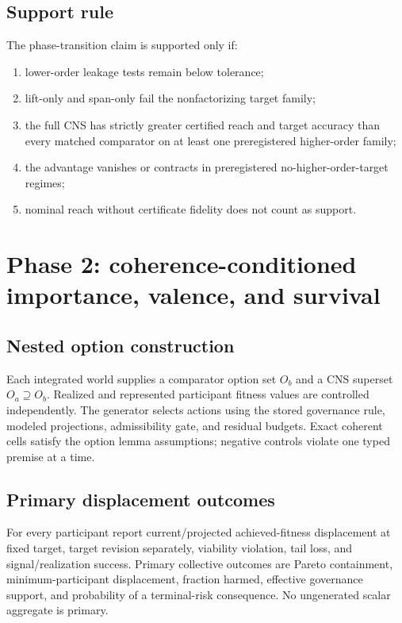 \documentclass[11pt]{article}
\begin{document}
\subsection{Support rule}

The phase-transition claim is supported only if:
\begin{enumerate}
\item lower-order leakage tests remain below tolerance;
\item lift-only and span-only fail the nonfactorizing target family;
\item the full CNS has strictly greater certified reach and target accuracy than every matched comparator on at least one preregistered higher-order family;
\item the advantage vanishes or contracts in preregistered no-higher-order-target regimes;
\item nominal reach without certificate fidelity does not count as support.
\end{enumerate}

\section{Phase 2: coherence-conditioned importance, valence, and survival}

\subsection{Nested option construction}

Each integrated world supplies a comparator option set $O_b$ and a CNS superset $O_a\supseteq O_b$. Realized and represented participant fitness values are controlled independently. The generator selects actions using the stored governance rule, modeled projections, admissibility gate, and residual budgets. Exact coherent cells satisfy the option lemma assumptions; negative controls violate one typed premise at a time.

\subsection{Primary displacement outcomes}

For every participant report current/projected achieved-fitness displacement at fixed target, target revision separately, viability violation, tail loss, and signal/realization success. Primary collective outcomes are Pareto containment, minimum-participant displacement, fraction harmed, effective governance support, and probability of a terminal-risk consequence. No ungenerated scalar aggregate is primary.
\end{document}
